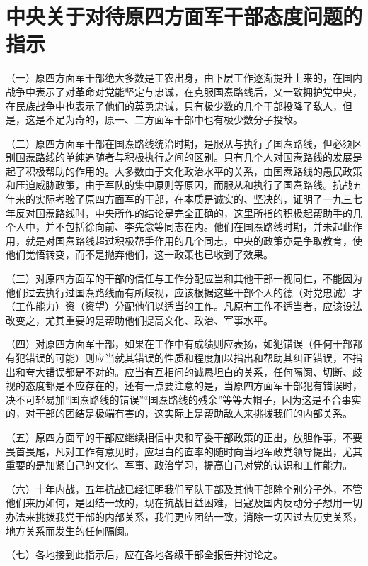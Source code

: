 \section[中央关于对待原四方面军干部态度问题的指示（一九四三年六月八日）]{中央关于对待原四方面军干部态度问题的指示}


（一）原四方面军干部绝大多数是工农出身，由下层工作逐渐提升上来的，在国内战争中表示了对革命对党能坚定与忠诚，在克服国焘路线后，又一致拥护党中央，在民族战争中也表示了他们的英勇忠诚，只有极少数的几个干部投降了敌人，但是，这是不足为奇的，原一、二方面军干部中也有极少数分子投敌。

（二）原四方面军干部在国焘路线统治时期，是服从与执行了国焘路线，但必须区别国焘路线的单纯追随者与积极执行之间的区别。只有几个人对国焘路线的发展是起了积极帮助的作用的。大多数由于文化政治水平的关系，由国焘路线的愚民政策和压迫威胁政策，由于军队的集中原则等原因，而服从和执行了国焘路线。抗战五年来的实际考验了原四方面军的干部，在本质是诚实的、坚决的，证明了一九三七年反对国焘路线时，中央所作的结论是完全正确的，这里所指的积极起帮助手的几个人中，并不包括徐向前、李先念等同志在内。他们在国焘路线时期，并未起此作用，就是对国焘路线超过积极帮手作用的几个同志，中央的政策亦是争取教育，使他们觉悟转变，而不是抛弃他们，这一政策也已收到了效果。

（三）对原四方面军的干部的信任与工作分配应当和其他干部一视同仁，不能因为他们过去执行过国焘路线而有所歧视，应该根据这些干部个人的德（对党忠诚）才（工作能力）资（资望）分配他们以适当的工作。凡原有工作不适当者，应该设法改变之，尤其重要的是帮助他们提高文化、政治、军事水平。

（四）对原四方面军干部，如果在工作中有成绩则应表扬，如犯错误（任何干部都有犯错误的可能）则应当就其错误的性质和程度加以指出和帮助其纠正错误，不指出和夸大错误都是不对的。应当有互相问的诚恳坦白的关系，任何隔阂、切断、歧视的态度都是不应存在的，还有一点要注意的是，当原四方面军干部犯有错误时，决不可轻易加“国焘路线的错误”“国焘路线的残余”等等大帽子，因为这是不合事实的，对干部的团结是极端有害的，这实际上是帮助敌人来挑拨我们的内部关系。

（五）原四方面军的干部应继续相信中央和军委干部政策的正出，放胆作事，不要畏首畏尾，凡对工作有意见时，应坦白的直率的随时向当地军政党领导提出，尤其重要的是加紧自己的文化、军事、政治学习，提高自己对党的认识和工作能力。

（六）十年内战，五年抗战已经证明我们军队干部及其他干部除个别分子外，不管他们来历如何，是团结一致的，现在抗战日益困难，日寇及国内反动分子想用一切办法来挑拨我党干部的内部关系，我们更应团结一致，消除一切因过去历史关系，地方关系而发生的任何隔阂。

（七）各地接到此指示后，应在各地各级干部全报告并讨论之。

